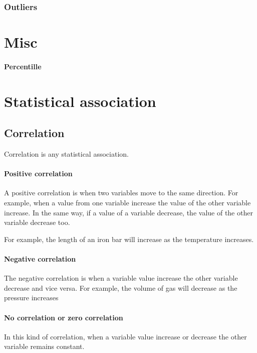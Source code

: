 \documentclass[]{article}
\begin{document}
\subsubsection{Outliers}

\section{Misc}

\paragraph{Percentille}

\section{Statistical association}

\subsection{Correlation}

Correlation is any statistical association.

\paragraph{Positive correlation}
A positive correlation is when two variables move to the same direction. For example, when a value from 
one variable increase the value of the other variable increase. In the same way, if a value of a variable
decrease, the value of the other variable decrease too.

For example, the length of an iron bar will increase as the temperature increases.

\paragraph{Negative correlation}
The negative correlation is when a variable value increase the other variable decrease and vice versa. 
For example, the volume of gas will decrease as the pressure increases

\paragraph{No correlation or zero correlation}
In this kind of correlation, when a variable value increase or decrease the other variable remains constant.


\end{document}
